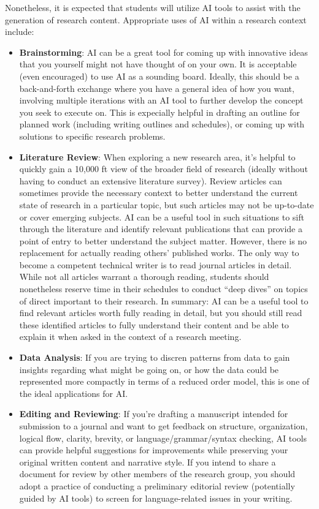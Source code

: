 \documentclass[12pt,a4paper,article,oneside]{memoir} %
\begin{document}
Nonetheless, it is expected that students will utilize AI tools to assist with the generation of research content. Appropriate uses of AI within a research context include:
\begin{itemize}
\item \textbf{Brainstorming}: AI can be a great tool for coming up with innovative ideas that you yourself might not have thought of on your own. It is acceptable (even encouraged) to use AI as a sounding board. Ideally, this should be a back-and-forth exchange where you have a general idea of how you want, involving multiple iterations with an AI tool to further develop the concept you seek to execute on. This is expecially helpful in drafting an outline for planned work (including writing outlines and schedules), or coming up with solutions to specific research problems.
\item \textbf{Literature Review}: When exploring a new research area, it's helpful to quickly gain a 10,000 ft view of the broader field of research (ideally without having to conduct an extensive literature survey). Review articles can sometimes provide the necessary context to better understand the current state of research in a particular topic, but such articles may not be up-to-date or cover emerging subjects. AI can be a useful tool in such situations to sift through the literature and identify relevant publications that can provide a point of entry to better understand the subject matter. However, there is no replacement for actually reading others' published works. The only way to become a competent technical writer is to read journal articles in detail. While not all articles warrant a thorough reading, students should nonetheless reserve time in their schedules to conduct ``deep dives'' on topics of direct important to their research. In summary: AI can be a useful tool to find relevant articles worth fully reading in detail, but you should still read these identified articles to fully understand their content and be able to explain it when asked in the context of a research meeting.
\item \textbf{Data Analysis}: If you are trying to discren patterns from data to gain insights regarding what might be going on, or how the data could be represented more compactly in terms of a reduced order model, this is one of the ideal applications for AI.
\item \textbf{Editing and Reviewing}: If you're drafting a manuscript intended for submission to a journal and want to get feedback on structure, organization, logical flow, clarity, brevity, or language/grammar/syntax checking, AI tools can provide helpful suggestions for improvements while preserving your original written content and narrative style. If you intend to share a document for review by other members of the research group, you should adopt a practice of conducting a preliminary editorial review (potentially guided by AI tools) to screen for language-related issues in your writing.

\end{itemize}
\end{document}
